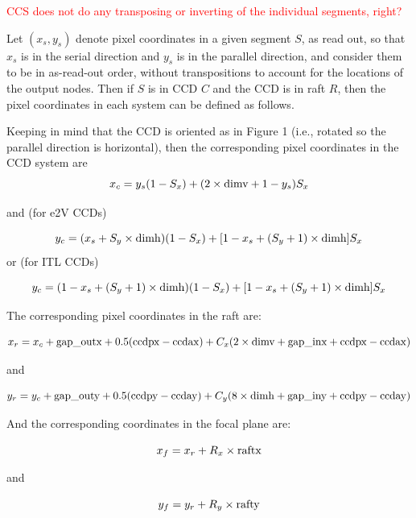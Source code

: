 \documentclass{article}[12pt]
\newcommand{\red}{\textcolor{red}}
\begin{document}
\red{CCS does not do any transposing or inverting of the individual segments, right?}

Let $(x_s, y_s)$ denote pixel coordinates in a given segment $S$, as read out, so that $x_s$ is in the serial direction and $y_s$ is in the parallel direction, and consider them to be in as-read-out order, without transpositions to account for the locations of the output nodes.  Then if $S$ is in CCD $C$ and the CCD is in raft $R$, then the pixel coordinates in each system can be defined as follows.

Keeping in mind that the CCD is oriented as in Figure 1 (i.e., rotated so the parallel direction is horizontal), then the corresponding pixel coordinates in the CCD system are 
\begin{equation}
x_c = y_s (1 - S_x) + (2 \times {\rm dimv} + 1 - y_s)  S_x
\end{equation}

and (for e2V CCDs)

\begin{equation}
y_c = (x_s + S_y \times {\rm dimh})  (1 - S_x) + [1 - x_s + (S_y + 1) \times {\rm dimh}] S_x
\end {equation}
or (for ITL CCDs)

\begin{equation}
y_c = (1 - x_s + (S_y  + 1) \times {\rm dimh} )  (1 - S_x) + [1 - x_s + (S_y + 1) \times {\rm dimh}] S_x
\end{equation}

The corresponding pixel coordinates in the raft are:

\begin{equation}
x_r = x_c + {\rm gap\_outx} + 0.5({\rm ccdpx} - {\rm ccdax}) + C_x ( 2 \times {\rm dimv} + {\rm gap\_inx} + {\rm ccdpx} - {\rm ccdax})
\end{equation}

and

\begin{equation}
y_r = y_c + {\rm gap\_outy} + 0.5({\rm ccdpy} - {\rm ccday}) + C_y ( 8 \times {\rm dimh} + {\rm gap\_iny} + {\rm ccdpy} - {\rm ccday})
\end{equation}

And the corresponding coordinates in the focal plane are:

\begin{equation}
x_f = x_r + R_x \times {\rm raftx}
\end{equation}

and

\begin{equation}
y_f = y_r + R_y \times {\rm rafty}
\end{equation}
\end{document}
